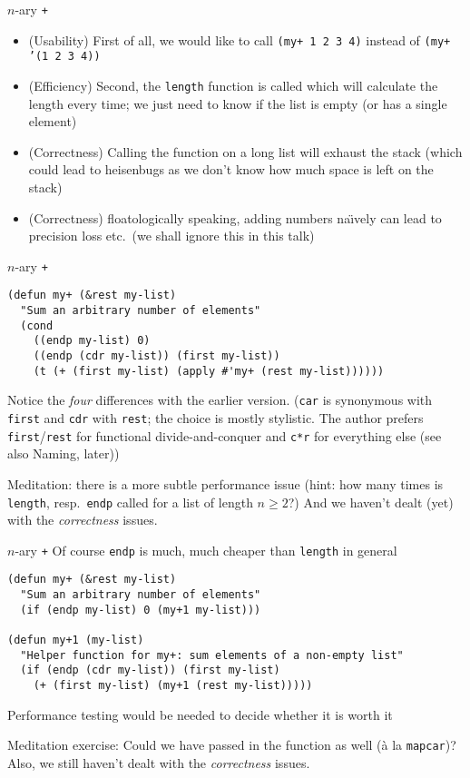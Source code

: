 \documentclass[presentation]{beamer}
\begin{document}
\begin{frame}{$n$-ary \texttt{+}}
  \begin{itemize}
  \item (Usability) First of all, we would like to call \texttt{(my+ 1 2 3 4)} instead of \texttt{(my+ '(1 2 3 4))}
  \item (Efficiency) Second, the \texttt{length} function is called which will calculate the length every time; we just need to know if the list is empty (or has a single element)
  \item (Correctness) Calling the function on a long list will exhaust the stack (which could lead to heisenbugs as we don't know how much space is left on the stack)
  \item (Correctness) floatologically speaking, adding numbers na\"\i vely can lead to precision loss etc.\ (we shall ignore this in this talk)
  \end{itemize}

\end{frame}

\begin{frame}[fragile]{$n$-ary \texttt{+}}
\begin{verbatim}
(defun my+ (&rest my-list)
  "Sum an arbitrary number of elements"
  (cond
    ((endp my-list) 0)
    ((endp (cdr my-list)) (first my-list))
    (t (+ (first my-list) (apply #'my+ (rest my-list))))))
\end{verbatim}
Notice the \emph{four} differences with the earlier version.  (\texttt{car} is synonymous with \texttt{first} and \texttt{cdr} with \texttt{rest}; the choice is mostly stylistic.  The author prefers \texttt{first}/\texttt{rest} for functional divide-and-conquer and \texttt{c*r} for everything else (see also Naming, later))

\smallskip
Meditation: there is a more subtle performance issue (hint: how many times is \texttt{length}, resp.\ \texttt{endp} called for a list of length $n\geq 2$?)  And we haven't dealt (yet) with the \emph{correctness} issues.
\end{frame}
\begin{frame}[fragile]{$n$-ary \texttt{+}}
Of course \texttt{endp} is much, much cheaper than \texttt{length} in general
\begin{verbatim}
(defun my+ (&rest my-list)
  "Sum an arbitrary number of elements"
  (if (endp my-list) 0 (my+1 my-list)))

(defun my+1 (my-list)
  "Helper function for my+: sum elements of a non-empty list"
  (if (endp (cdr my-list)) (first my-list)
    (+ (first my-list) (my+1 (rest my-list)))))
\end{verbatim}
Performance testing would be needed to decide whether it is worth it

\smallskip
Meditation exercise: Could we have passed in the function as well (\`a la \texttt{mapcar})?  Also, we still haven't dealt with the \emph{correctness} issues.
\end{frame}
\end{document}
